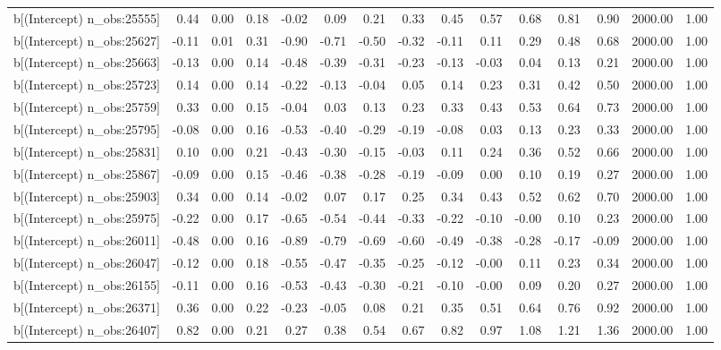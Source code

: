 \begin{table}[ht]
\begin{tabular}{rrrrrrrrrrrrrrr}
  b[(Intercept) n\_obs:25555] & 0.44 & 0.00 & 0.18 & -0.02 & 0.09 & 0.21 & 0.33 & 0.45 & 0.57 & 0.68 & 0.81 & 0.90 & 2000.00 & 1.00 \\ 
  b[(Intercept) n\_obs:25627] & -0.11 & 0.01 & 0.31 & -0.90 & -0.71 & -0.50 & -0.32 & -0.11 & 0.11 & 0.29 & 0.48 & 0.68 & 2000.00 & 1.00 \\ 
  b[(Intercept) n\_obs:25663] & -0.13 & 0.00 & 0.14 & -0.48 & -0.39 & -0.31 & -0.23 & -0.13 & -0.03 & 0.04 & 0.13 & 0.21 & 2000.00 & 1.00 \\ 
  b[(Intercept) n\_obs:25723] & 0.14 & 0.00 & 0.14 & -0.22 & -0.13 & -0.04 & 0.05 & 0.14 & 0.23 & 0.31 & 0.42 & 0.50 & 2000.00 & 1.00 \\ 
  b[(Intercept) n\_obs:25759] & 0.33 & 0.00 & 0.15 & -0.04 & 0.03 & 0.13 & 0.23 & 0.33 & 0.43 & 0.53 & 0.64 & 0.73 & 2000.00 & 1.00 \\ 
  b[(Intercept) n\_obs:25795] & -0.08 & 0.00 & 0.16 & -0.53 & -0.40 & -0.29 & -0.19 & -0.08 & 0.03 & 0.13 & 0.23 & 0.33 & 2000.00 & 1.00 \\ 
  b[(Intercept) n\_obs:25831] & 0.10 & 0.00 & 0.21 & -0.43 & -0.30 & -0.15 & -0.03 & 0.11 & 0.24 & 0.36 & 0.52 & 0.66 & 2000.00 & 1.00 \\ 
  b[(Intercept) n\_obs:25867] & -0.09 & 0.00 & 0.15 & -0.46 & -0.38 & -0.28 & -0.19 & -0.09 & 0.00 & 0.10 & 0.19 & 0.27 & 2000.00 & 1.00 \\ 
  b[(Intercept) n\_obs:25903] & 0.34 & 0.00 & 0.14 & -0.02 & 0.07 & 0.17 & 0.25 & 0.34 & 0.43 & 0.52 & 0.62 & 0.70 & 2000.00 & 1.00 \\ 
  b[(Intercept) n\_obs:25975] & -0.22 & 0.00 & 0.17 & -0.65 & -0.54 & -0.44 & -0.33 & -0.22 & -0.10 & -0.00 & 0.10 & 0.23 & 2000.00 & 1.00 \\ 
  b[(Intercept) n\_obs:26011] & -0.48 & 0.00 & 0.16 & -0.89 & -0.79 & -0.69 & -0.60 & -0.49 & -0.38 & -0.28 & -0.17 & -0.09 & 2000.00 & 1.00 \\ 
  b[(Intercept) n\_obs:26047] & -0.12 & 0.00 & 0.18 & -0.55 & -0.47 & -0.35 & -0.25 & -0.12 & -0.00 & 0.11 & 0.23 & 0.34 & 2000.00 & 1.00 \\ 
  b[(Intercept) n\_obs:26155] & -0.11 & 0.00 & 0.16 & -0.53 & -0.43 & -0.30 & -0.21 & -0.10 & -0.00 & 0.09 & 0.20 & 0.27 & 2000.00 & 1.00 \\ 
  b[(Intercept) n\_obs:26371] & 0.36 & 0.00 & 0.22 & -0.23 & -0.05 & 0.08 & 0.21 & 0.35 & 0.51 & 0.64 & 0.76 & 0.92 & 2000.00 & 1.00 \\ 
  b[(Intercept) n\_obs:26407] & 0.82 & 0.00 & 0.21 & 0.27 & 0.38 & 0.54 & 0.67 & 0.82 & 0.97 & 1.08 & 1.21 & 1.36 & 2000.00 & 1.00 \\ 

\end{tabular}
\end{table}
